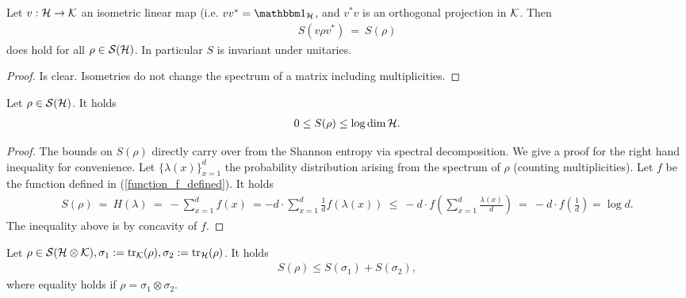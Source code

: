   
  
  
  \begin{lemma} \label{entropy!von Neumann!Invariance under isometries}
  Let $v: {\mathcal H} \rightarrow {\mathcal K}$ an isometric linear map (i.e. $vv^\ast = \bbmeins_{\cH}$, and $v^\ast v$ is an orthogonal projection in ${\mathcal K}$. Then 
  \begin{align}
     S(v\rho v^\ast) \ = \ S(\rho)
  \end{align}
  does hold for all $\rho \in {\mathcal S}({\mathcal H})$. In particular $S$ is invariant under unitaries.
  \end{lemma}
  \begin{proof}
  	Is clear. Isometries do not change the spectrum of a matrix including multiplicities. 
  \end{proof}
  \begin{lemma} \label{lemma:von_neumann_entropy_bounds}
  Let $\rho \in {\mathcal S}({\mathcal H})$. It holds
  \begin{align}
  0 \leq S(\rho) \leq \log \dim {\mathcal H}.
  \end{align}
  \end{lemma}
  \begin{proof}
  	The bounds on $S(\rho)$ directly carry over from the Shannon entropy via spectral decomposition. We give a proof for the right hand inequality for convenience. Let $\{\lambda(x)\}_{x=1}^{d}$ the 
  	probability distribution arising from the spectrum of $\rho$ (counting multiplicities). Let $f$ 
  	be the function defined in (\ref{function_f_defined}). It holds
  	\begin{align*}
  	 S(\rho) \ = \ H(\lambda) \ = \ - \sum_{x=1}^d f(x) \ = - d \cdot \sum_{x=1}^d \frac{1}{d} f(\lambda(x)) \ \leq \ - d \cdot f\left(\sum_{x=1}^d \frac{\lambda(x)}{d}\right) \ = \ - d \cdot f\left(\frac{1}{d}\right) = \log d. 
  	\end{align*} 
  	The inequality above is by concavity of $f$.
  \end{proof}
  \begin{lemma} \label{lemma:von_neumann_subadditivity} 
   Let $\rho \in {\mathcal S}({\mathcal H} \otimes {\mathcal K}), \sigma_1 := \mathrm{tr}_{\mathcal K}(\rho), \sigma_2 := \mathrm{tr}_{\mathcal H}(\rho)$. It holds
   \begin{align}
   S(\rho) \leq S(\sigma_1) + S(\sigma_2),
   \end{align}
   where equality holds if $\rho = \sigma_1 \otimes \sigma_2$.
  \end{lemma}
